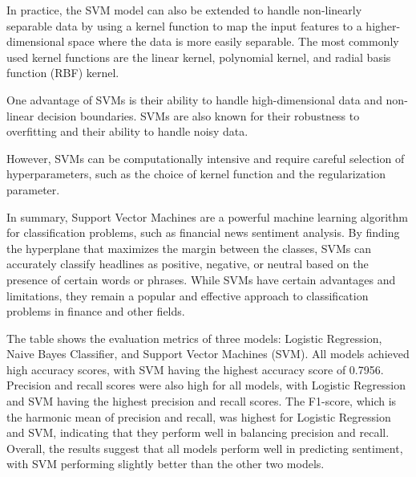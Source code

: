 \documentclass{article}
\begin{document}
In practice, the SVM model can also be extended to handle non-linearly separable data by using a kernel function to map the input features to a higher-dimensional space where the data is more easily separable. The most commonly used kernel functions are the linear kernel, polynomial kernel, and radial basis function (RBF) kernel.

One advantage of SVMs is their ability to handle high-dimensional data and non-linear decision boundaries. SVMs are also known for their robustness to overfitting and their ability to handle noisy data.

However, SVMs can be computationally intensive and require careful selection of hyperparameters, such as the choice of kernel function and the regularization parameter.

In summary, Support Vector Machines are a powerful machine learning algorithm for classification problems, such as financial news sentiment analysis. By finding the hyperplane that maximizes the margin between the classes, SVMs can accurately classify headlines as positive, negative, or neutral based on the presence of certain words or phrases. While SVMs have certain advantages and limitations, they remain a popular and effective approach to classification problems in finance and other fields.


The table shows the evaluation metrics of three models: Logistic Regression, Naive Bayes Classifier, and Support Vector Machines (SVM). All models achieved high accuracy scores, with SVM having the highest accuracy score of 0.7956. Precision and recall scores were also high for all models, with Logistic Regression and SVM having the highest precision and recall scores. The F1-score, which is the harmonic mean of precision and recall, was highest for Logistic Regression and SVM, indicating that they perform well in balancing precision and recall. Overall, the results suggest that all models perform well in predicting sentiment, with SVM performing slightly better than the other two models.
\end{document}
